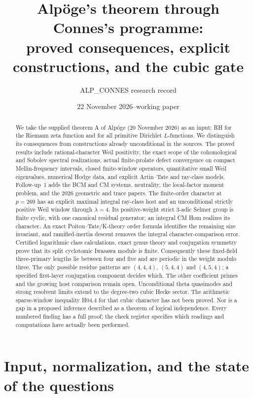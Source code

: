 \documentclass[11pt,a4paper]{article}
\title{Alp\"oge's theorem through Connes's programme:\\
proved consequences, explicit constructions, and the cubic gate}
\author{ALP\_CONNES research record}
\date{22 November 2026\quad--\quad working paper}
\theoremstyle{definition}
\theoremstyle{remark}
\begin{document}
\maketitle
\begin{abstract}
We take the supplied theorem A of Alp\"oge (20 November 2026) as an
input: RH for the Riemann zeta function and for all primitive
Dirichlet $L$-functions. We distinguish its consequences from
constructions already unconditional in the sources. The proved
results include rational-character Weil positivity, the exact
scope of the cohomological and Sobolev spectral realizations,
actual finite-prolate defect convergence on compact Mellin-frequency
intervals, closed finite-window operators, quantitative small Weil
eigenvalues, numerical Hodge data, and explicit Artin--Tate and
ray-class models. Follow-up~1 adds the BCM and CM systems,
neutrality, the local-factor moment problem, and the 2026
geometric and trace papers. The finite-order character at
$p=269$ has an explicit maximal integral ray-class host and
an unconditional strictly positive Weil window through
$\lambda=4$. Its positive-weight strict $3$-adic Selmer
group is finite cyclic, with one canonical residual generator;
an integral CM Hom realizes its character. An exact
Poitou--Tate/K-theory order formula identifies the remaining
size invariant, and ramified-inertia descent removes the
integral character-comparison error. Certified logarithmic
class calculations, exact genus theory and conjugation symmetry
prove that its split cyclotomic Iwasawa module is finite.
Consequently these fixed-field three-primary lengths lie
between four and five and are periodic in the weight modulo three.
The only possible residue patterns are $(4,4,4)$, $(5,4,4)$ and
$(4,5,4)$; a specified first-layer conjugation component decides which.
The other coefficient
primes and the growing host comparison remain open.
Unconditional theta quasimodes and strong
resolvent limits extend to the degree-two cubic Hecke sector.
The arithmetic sparse-window inequality H04.4
for that cubic character has not been proved. Nor is a
gap in a proposed inference described as a theorem of
logical independence. Every numbered finding has a full
proof; the check register specifies which readings and
computations have actually been performed.
\end{abstract}

\tableofcontents
\clearpage

\section{Input, normalization, and the state of the questions}
\label{sec:input}
\end{document}
